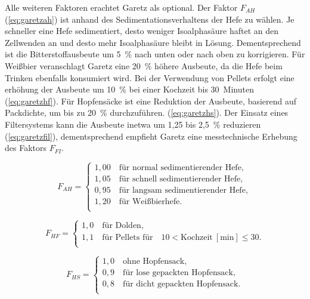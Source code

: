 \documentclass[a4paper,parskip=half]{scrartcl}
\newcommand{\umin}{\:[\textrm{min}]}
\newcommand{\FAH}{F_{\mathit{AH}}}
\newcommand{\FHF}{F_{\mathit{HF}}}
\newcommand{\FHS}{F_{\mathit{HS}}}
\newcommand{\FFil}{F_{\mathit{FI}}}
\begin{document}
Alle weiteren Faktoren erachtet Garetz als optional. Der Faktor
$\FAH$ (\autoref{eq:garetzah}) ist anhand des Sedimentationsverhaltens
der Hefe zu wählen. Je schneller eine Hefe sedimentiert, desto
weniger Isoalphasäure haftet an den Zellwenden an und desto
mehr Isoalphasäure bleibt in Lösung. Dementsprechend ist die
Bitterstoffausbeute um 5~\% nach unten oder nach oben zu korrigieren. 
Für Weißbier veranschlagt Garetz eine 20~\% höhere Ausbeute,
da die Hefe beim Trinken ebenfalls konsumiert wird.
Bei der Verwendung von Pellets erfolgt eine erhöhung der
Ausbeute um 10~\% bei einer Kochzeit bis 30~Minuten (\autoref{eq:garetzhf}).
Für Hopfensäcke ist eine Reduktion der Ausbeute,
basierend auf Packdichte, um bis zu 20~\% durchzuführen.
(\autoref{eq:garetzhs}). Der Einsatz eines Filtersystems kann
die Ausbeute inetwa um 1,25 bis 2,5~\% reduzieren (\autoref{eq:garetzfil}),
dementsprechend empfieht Garetz eine messtechnische Erhebung des Faktors $\FFil$. \parencite[140\psq]{Garetz1994}

\begin{equation}
\FAH = \begin{cases}
1,00 \quad \text{für normal sedimentierender Hefe}, \\
1,05 \quad \text{für schnell sedimentierender Hefe}, \\
0,95 \quad \text{für langsam sedimentierender Hefe}, \\
1,20 \quad \text{für Weißbierhefe}. \\
\end{cases}
\label{eq:garetzah}
\end{equation}


\begin{equation}
\FHF = \begin{cases}
1,0 \quad \text{für Dolden}, \\
1,1 \quad \text{für Pellets für} \quad 10 < \text{Kochzeit} \umin \le 30. \\
\end{cases}
\label{eq:garetzhf}
\end{equation}

\begin{equation}
\FHS = \begin{cases}
1,0 \quad \text{ohne Hopfensack}, \\
0,9 \quad \text{für lose gepackten Hopfensack}, \\
0,8 \quad \text{für dicht gepackten Hopfensack}. \\
\end{cases}
\label{eq:garetzhs}
\end{equation}
\end{document}
